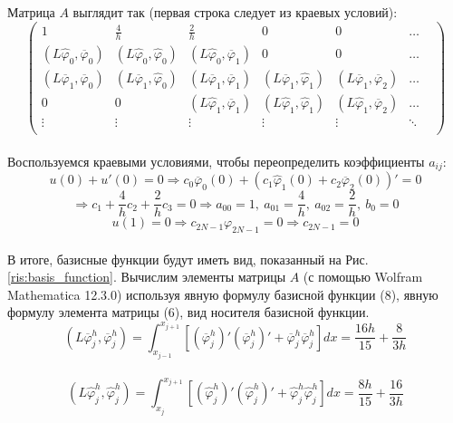 \documentclass[12pt, a4paper]{article}
\begin{document}
	Матрица $A$ выглядит так (первая строка следует из краевых условий):\\
	$$ 
	\begin{pmatrix} 
		1 & 
			\frac{4}{h} &
			\frac{2}{h} &
			0 &
			0 &
			\ldots &\\
		(L\widehat{\varphi}_0, \overline{\varphi}_0) & 
			(L\widehat{\varphi}_0, \widehat{\varphi}_0) &
			(L\widehat{\varphi}_0, \overline{\varphi}_1) &
			0 &
			0 &
			\ldots &\\
		(L\overline{\varphi}_1, \overline{\varphi}_0) & 
			(L\overline{\varphi}_1, \widehat{\varphi}_0) &
			(L\overline{\varphi}_1, \overline{\varphi}_1) &
			(L\overline{\varphi}_1, \widehat{\varphi}_1) &
			(L\overline{\varphi}_1, \overline{\varphi}_2) &
			\ldots &\\
		0 &
			0 &
			(L\widehat{\varphi}_1, \overline{\varphi}_1) &
			(L\widehat{\varphi}_1, \widehat{\varphi}_1) &
			(L\widehat{\varphi}_1, \overline{\varphi}_2) &
			\ldots &\\
		\vdots &
			\vdots &
			\vdots &
			\vdots & 
			\vdots &
			\ddots &\\ 
	\end{pmatrix} 
	$$\\
	Воспользуемся краевыми условиями, чтобы переопределить коэффициенты $a_{ij}$:\\
	$$
		u(0) + u'(0) = 0 
		\Rightarrow c_0\overline{\varphi}_0(0) + 
			(c_1\widehat{\varphi}_1(0) + c_2\overline{\varphi}_2(0))' = 0
	$$
	$$
		\Rightarrow c_1 + \frac{4}{h}c_2 + \frac{2}{h}c_3 = 0
		\Rightarrow a_{00} = 1,\ a_{01} = \frac{4}{h},\ a_{02} = \frac{2}{h},\ b_{0} = 0
	$$
	$$
		u(1) = 0 
			\Rightarrow c_{2N-1}\varphi_{2N-1} = 0 
			\Rightarrow c_{2N-1} = 0
	$$\\
	В итоге, базисные функции будут иметь вид, 
	показанный на Рис. \ref{ris:basis_function}.
	Вычислим элементы матрицы $A$ 
	(с помощью Wolfram Mathematica 12.3.0) используя явную формулу базисной функции (8), 
	явную формулу элемента матрицы (6), вид носителя базисной функции.\\
	$$
		(L\overline{\varphi}_j^h, \overline{\varphi}_j^h) =
		\int_{x_{j-1}}^{x_{j+1}} [(\overline{\varphi}_j^h)'(\overline{\varphi}_j^h)' +
		\overline{\varphi}_j^h\overline{\varphi}_j^h]dx =
		\frac{16h}{15} + \frac{8}{3h}
	$$\\
	$$
		(L\widehat{\varphi}_j^h, \widehat{\varphi}_j^h) =
		\int_{x_{j}}^{x_{j+1}} [(\widehat{\varphi}_j^h)'(\widehat{\varphi}_j^h)' +
		\widehat{\varphi}_j^h\widehat{\varphi}_j^h]dx =
		\frac{8h}{15} + \frac{16}{3h}
	$$\\
\end{document}
